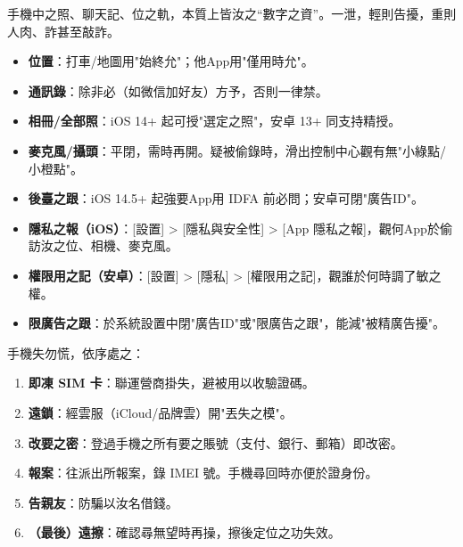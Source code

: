 
手機中之照、聊天記、位之軌，本質上皆汝之“數字之資”。一泄，輕則告擾，重則人肉、詐甚至敲詐。


\begin{itemize}
  \item \textbf{位置}：打車/地圖用"始終允"；他App用"僅用時允"。
  \item \textbf{通訊錄}：除非必（如微信加好友）方予，否則一律禁。
  \item \textbf{相冊/全部照}：iOS 14+ 起可授"選定之照"，安卓 13+ 同支持精授。
  \item \textbf{麥克風/攝頭}：平閉，需時再開。疑被偷錄時，滑出控制中心觀有無"小綠點/小橙點"。
  \item \textbf{後臺之跟}：iOS 14.5+ 起強要App用 IDFA 前必問；安卓可閉"廣告ID"。
\end{itemize}


\begin{itemize}
  \item \textbf{隱私之報（iOS）}：[設置] > [隱私與安全性] > [App 隱私之報]，觀何App於偷訪汝之位、相機、麥克風。
  \item \textbf{權限用之記（安卓）}：[設置] > [隱私] > [權限用之記]，觀誰於何時調了敏之權。
  \item \textbf{限廣告之跟}：於系統設置中閉"廣告ID"或"限廣告之跟"，能減"被精廣告擾"。
\end{itemize}


手機失勿慌，依序處之：

\begin{enumerate}
  \item \textbf{即凍 SIM 卡}：聯運營商掛失，避被用以收驗證碼。
  \item \textbf{遠鎖}：經雲服（iCloud/品牌雲）開"丟失之模"。
  \item \textbf{改要之密}：登過手機之所有要之賬號（支付、銀行、郵箱）即改密。
  \item \textbf{報案}：往派出所報案，錄 IMEI 號。手機尋回時亦便於證身份。
  \item \textbf{告親友}：防騙以汝名借錢。
  \item \textbf{（最後）遠擦}：確認尋無望時再操，擦後定位之功失效。
\end{enumerate}


